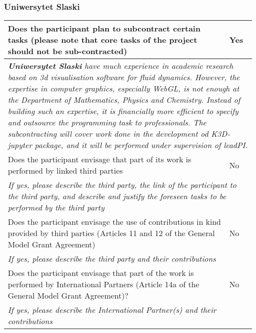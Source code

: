 \subsubsection{Uniwersytet Slaski}
%
\begin{tabular}{|p{}|p{1cm}|}\hline
Does the participant plan to subcontract certain tasks (please note that core
tasks of the project should not be sub-contracted) & Yes\\\hline
%
\multicolumn{2}{|p{\textwidth}|}{
\textit{\textbf{Uniwersytet Slaski} have much experience in academic 
research based on 3d visualisation software for fluid dynamics. However, the expertise in 
computer graphics, especially  WebGL, is not enough at the Department of Mathematics, 
Physics and Chemistry. Instead of building such an expertise, it is financially more 
efficient to specify and outsource the programming task to professionals. The subcontracting 
will cover work done in the development od K3D-jupyter package, and it will be performed 
under supervision of leadPI.}
}
\\\hline
%   
Does the participant envisage that part of its work is performed by linked
third parties & No\\\hline
%
 \multicolumn{2}{|p{\textwidth}|}{
 \textit{If yes, please describe the third party, the link of the participant to 
 the third party, and describe and justify the foreseen tasks to be performed by the third party}
 }
 \\\hline
Does the participant envisage the use of contributions in kind provided by third parties (Articles 11 and 12 of
the General Model Grant Agreement) & No\\\hline
%
\multicolumn{2}{|p{\textwidth}|}{\textit{If yes, please describe the third party and their contributions}}\\\hline
%  
Does the participant envisage that part of the work is performed by International Partners (Article 14a of the
General Model Grant Agreement)? & No\\\hline
%   
\multicolumn{2}{|p{\textwidth}|}{\textit{If yes, please describe the International Partner(s) 
and their contributions}}\\\hline
%
\end{tabular}
%


